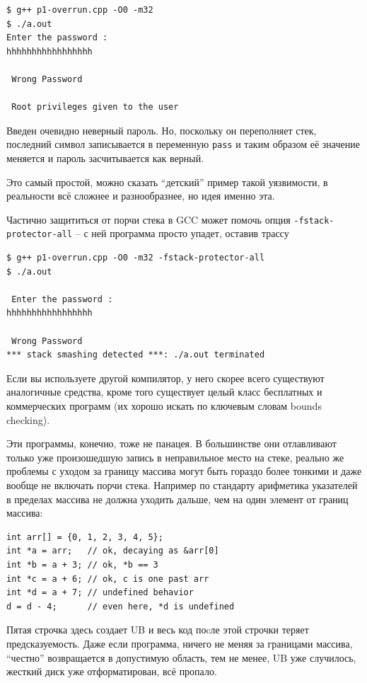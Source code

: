 \documentclass[a4paper,12pt,oneside]{book}
\begin{document}
\begin{verbatim}
$ g++ p1-overrun.cpp -O0 -m32
$ ./a.out
Enter the password : 
hhhhhhhhhhhhhhhhh

 Wrong Password 

 Root privileges given to the user 
\end{verbatim}

Введен очевидно неверный пароль. Но, поскольку он переполняет стек, последний символ записывается в переменную \lstinline!pass! и таким образом её значение меняется и пароль засчитывается как верный.

Это самый простой, можно сказать ``детский'' пример такой уязвимости, в реальности всё сложнее и разнообразнее, но идея именно эта.

Частично защититься от порчи стека в GCC может помочь опция \lstinline!-fstack-protector-all! -- с ней программа просто упадет, оставив трассу

\begin{verbatim}
$ g++ p1-overrun.cpp -O0 -m32 -fstack-protector-all
$ ./a.out 

 Enter the password : 
hhhhhhhhhhhhhhhhh

 Wrong Password 
*** stack smashing detected ***: ./a.out terminated
\end{verbatim}

Если вы используете другой компилятор, у него скорее всего существуют аналогичные средства, кроме того существует целый класс бесплатных и коммерческих программ (их хорошо искать по ключевым словам bounds checking).

Эти программы, конечно, тоже не панацея. В большинстве они отлавливают только уже произошедшую запись в неправильное место на стеке, реально же проблемы с уходом за границу массива могут быть гораздо более тонкими и даже вообще не включать порчи стека. Например по стандарту арифметика указателей в пределах массива не должна уходить дальше, чем на один элемент от границ массива:

\begin{lstlisting}
int arr[] = {0, 1, 2, 3, 4, 5};
int *a = arr;   // ok, decaying as &arr[0]
int *b = a + 3; // ok, *b == 3
int *c = a + 6; // ok, c is one past arr
int *d = a + 7; // undefined behavior
d = d - 4;      // even here, *d is undefined
\end{lstlisting}

Пятая строчка здесь создает UB и весь код поcле этой строчки теряет предсказуемость. Даже если программа, ничего не меняя за границами массива, ``честно'' возвращается в допустимую область, тем не менее, UB уже случилось, жесткий диск уже отформатирован, всё пропало.
\end{document}
